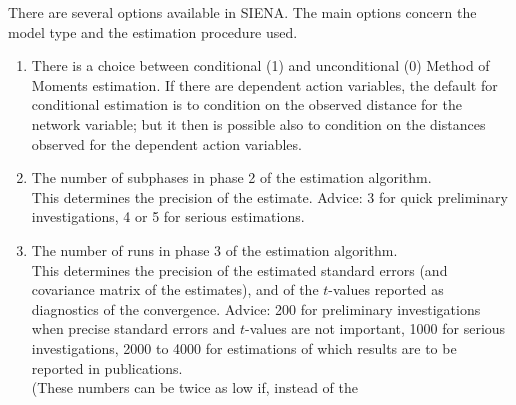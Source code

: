 \documentclass[a4paper,fleqn]{article}
\newcommand{\+}{\, + \,}
\newcommand{\si}{{\sf SIENA}}
\begin{document}
{\hypertarget{T_S_options}{}
There are several options available in \si. The main options
concern the model type and the estimation procedure used.


\begin{enumerate}
\item There is a choice between conditional (1) and unconditional (0)
Method of Moments estimation. If there are dependent action variables, the default for
conditional estimation is to condition on the observed distance
for the network variable; but it then is possible also to condition
on the distances observed for the dependent action variables.\\
\item The number of subphases in phase 2 of the estimation algorithm.\\
      This determines the precision of the estimate.
      Advice: 3 for quick preliminary investigations,
      4 or 5 for serious estimations.
\item The number of runs in phase 3 of the estimation algorithm.\\
      This determines the precision of the estimated standard errors
      (and covariance matrix of the estimates),
      and of the $t$-values reported as diagnostics of the convergence.
      Advice: 200 for preliminary investigations when precise standard errors
      and $t$-values are not important,
      1000 for serious investigations,
      2000 to 4000 for estimations of which results are to be reported
      in publications.\\
      (These numbers can be twice as low if, instead of the

\end{enumerate}}
\end{document}
